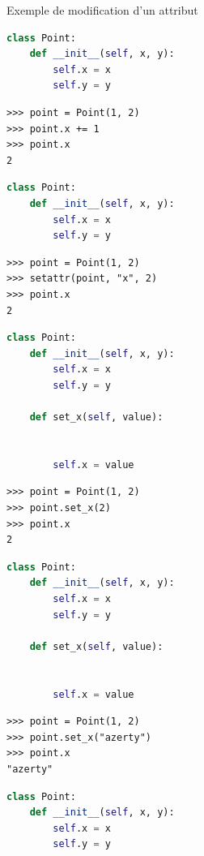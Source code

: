\documentclass[10pt]{beamer}
\begin{document}
\begin{frame}[fragile]{Exemple de modification d'un attribut}

\begin{overprint}

\begin{lstlisting}[language=Python, numbers=none]
class Point:
    def __init__(self, x, y):
        self.x = x
        self.y = y
\end{lstlisting}

\begin{lstlisting}[numbers=none]
>>> point = Point(1, 2)
>>> point.x += 1
>>> point.x
2
\end{lstlisting}

\begin{lstlisting}[language=Python, numbers=none]
class Point:
    def __init__(self, x, y):
        self.x = x
        self.y = y
\end{lstlisting}

\begin{lstlisting}[numbers=none]
>>> point = Point(1, 2)
>>> setattr(point, "x", 2)
>>> point.x
2
\end{lstlisting}


\begin{lstlisting}[language=Python, numbers=none]
class Point:
    def __init__(self, x, y):
        self.x = x
        self.y = y

    def set_x(self, value):


        self.x = value
\end{lstlisting}

\begin{lstlisting}[numbers=none]
>>> point = Point(1, 2)
>>> point.set_x(2)
>>> point.x
2
\end{lstlisting}


\begin{lstlisting}[language=Python, numbers=none]
class Point:
    def __init__(self, x, y):
        self.x = x
        self.y = y

    def set_x(self, value):


        self.x = value
\end{lstlisting}

\begin{lstlisting}[numbers=none]
>>> point = Point(1, 2)
>>> point.set_x("azerty")
>>> point.x
"azerty"
\end{lstlisting}


\begin{lstlisting}[language=Python, numbers=none]
class Point:
    def __init__(self, x, y):
        self.x = x
        self.y = y


\end{lstlisting}
\end{overprint}
\end{frame}
\end{document}
